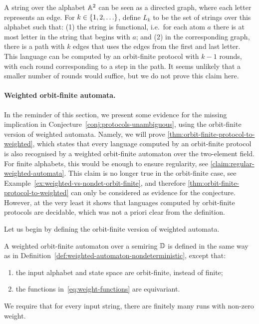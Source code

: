 \begin{myexample}
    A string over the alphabet $\mathbb A^2$ can be seen as a directed graph, where each letter represents an edge. For $k \in \{1,2,\ldots\}$, define  $L_k$ to be the set of strings over this alphabet such that: (1) the string is functional, i.e.~for each atom $a$ there is at most letter in the string that begins with $a$; and (2) in the corresponding graph, there is a path with $k$ edges that uses the edges from the first and last letter. This language can be computed by an orbit-finite protocol with $k-1$ rounds, with each round corresponding to a step in the path. It seems unlikely that a smaller number of rounds would suffice, but we do not prove this claim here. 
\end{myexample}



\paragraph*{Weighted orbit-finite automata.} In the reminder of this section, we present some evidence for the missing implication
in Conjecture~\ref{conj:protocols-unambiguous}, using the orbit-finite version of weighted automata. Namely, we will prove
\cref{thm:orbit-finite-protocol-to-weighted}, which states that every language computed by an orbit-finite protocol is also recognised by a weighted orbit-finite automaton over the two-element field.
For finite alphabets, this would be enough to ensure regularity, see \cref{claim:regular-weighted-automata}. This claim is no longer true in the orbit-finite case, see Example~\ref{ex:weighted-vs-nondet-orbit-finite}, and therefore \cref{thm:orbit-finite-protocol-to-weighted} can only be considered as evidence for the conjecture. However, at the very least it shows that languages computed by orbit-finite protocols are decidable, which was not a priori clear from the definition.

Let us begin by defining the orbit-finite version of weighted automata. 
\begin{definition}
    \label{def:weighted-orbit-finite-automata}
    A weighted orbit-finite automaton over a semiring $\mathbb D$ is defined in the same way as in Definition~\ref{def:weighted-automaton-nondeterministic}, except that:
    \begin{enumerate}
        \item the input alphabet and state space are orbit-finite, instead of finite;
        \item the functions in~\eqref{eq:weight-functions} are equivariant.
    \end{enumerate}
     We require that for every input string, there are finitely many runs with non-zero weight.
\end{definition}

